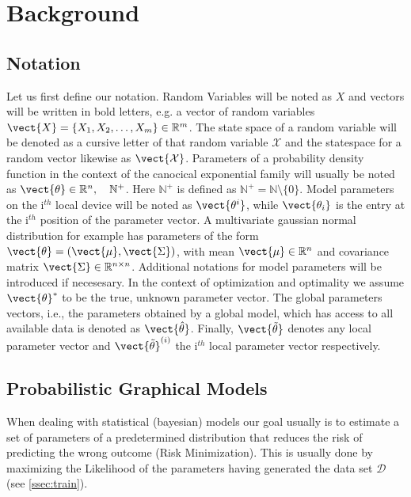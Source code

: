 \chapter{Background}
\label{chapter:kap2}

\section{Notation}
    \label{sec:nota}
    Let us first define our notation. 
    Random Variables will be noted as $X$ and vectors will be written in bold letters, e.g. a vector of random variables $\vect{X} = \{X_1, X_2, \ldots, X_m\} \in \mathbb{R}^m$.
    The state space of a random variable will be denoted as a cursive letter of that random variable $\mathcal{X}$ and the statespace for  a random vector likewise as $\vect{\mathcal{X}}$.
    Parameters of a probability density function in the context of the canocical exponential family will usually be noted as $\vect{\theta} \in \mathbb{R}^n, \quad \mathbb{N}^+$.
    Here $\mathbb{N}^+$ is defined as $ \mathbb{N}^+ = \mathbb{N} \setminus \{0\}$.
    Model parameters on the i$^{th}$ local device will be noted as $\vect{\theta^i}$, while $\vect{\theta_i}$ is the entry at the i$^{th}$ position of the parameter vector.
    A multivariate gaussian normal distribution for example has parameters of the form $\vect{\theta} = (\vect{\mu}, \vect{\Sigma})$, with mean $\vect{\mu} \in \mathbb{R}^{n}$ and covariance matrix $\vect{\Sigma} \in \mathbb{R}^{n \times n}$.
    Additional notations for model parameters will be introduced if necesesary.
    In the context of optimization and optimality we assume $\vect{\theta}^*$ to be the true, unknown parameter vector.
    The global parameters vectors, i.e., the parameters obtained by a global model, which has access to all available data is denoted as  $\vect{\hat{\theta}}$.
    Finally, $\vect{\tilde{\theta}}$ denotes any local parameter vector and $\vect{\tilde{\theta}}^{(i)}$ the i$^{th}$ local parameter vector respectively.

\section{Probabilistic Graphical Models}
\label{sec:pgm}
When dealing with statistical (bayesian) models our goal usually is to estimate a set of parameters of a predetermined distribution that reduces the risk of predicting the wrong outcome (Risk Minimization). 
This is usually done by maximizing the Likelihood of the parameters having generated the data set $\mathcal{D}$ (see \ref{ssec:train}).

